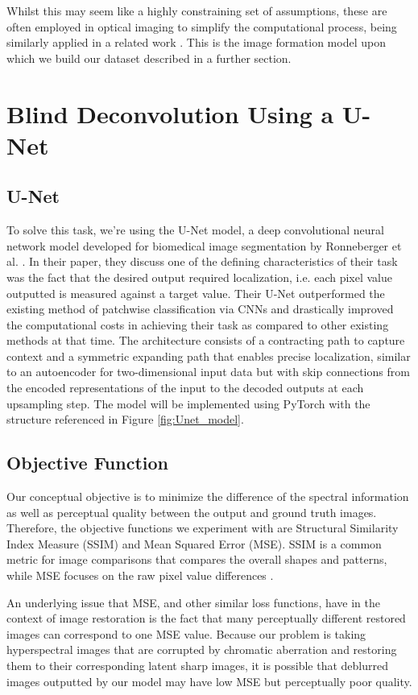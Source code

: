 \documentclass{article}
\begin{document}
Whilst this may seem like a highly constraining set of assumptions, these are often employed in optical imaging to simplify the computational process, being similarly applied in a related work \cite{jeon2019compact}. This is the image formation model upon which we build our dataset described in a further section.

\section{Blind Deconvolution Using a U-Net}

\subsection{U-Net}
To solve this task, we're using the U-Net model, a deep convolutional neural network model developed for biomedical image segmentation by Ronneberger et al. \cite{Ronneberger_2018}. In their paper, they discuss one of the defining characteristics of their task was the fact that the desired output required localization, i.e. each pixel value outputted is measured against a target value. Their U-Net outperformed the existing method of patchwise classification via CNNs and drastically improved the computational costs in achieving their task as compared to other existing methods at that time. The architecture consists of a contracting path to capture context and a symmetric expanding path that enables precise localization, similar to an autoencoder for two-dimensional input data but with skip connections from the encoded representations of the input to the decoded outputs at each upsampling step. The model will be implemented using PyTorch with the structure referenced in Figure \ref{fig:Unet_model}.   

\subsection{Objective Function}
Our conceptual objective is to minimize the difference of the spectral information as well as perceptual quality between the output and ground truth images. Therefore, the objective functions we experiment with are Structural Similarity Index Measure (SSIM) and Mean Squared Error (MSE). SSIM is a common metric for image comparisons that compares the overall shapes and patterns, while MSE focuses on the raw pixel value differences \cite{Brunet_Vrscay_Wang_2011}.

An underlying issue that MSE, and other similar loss functions, have in the context of image restoration is the fact that many perceptually different restored images can correspond to one MSE value. Because our problem is taking hyperspectral images that are corrupted by chromatic aberration and restoring them to their corresponding latent sharp images, it is possible that deblurred images outputted by our model may have low MSE but perceptually poor quality.
\end{document}
